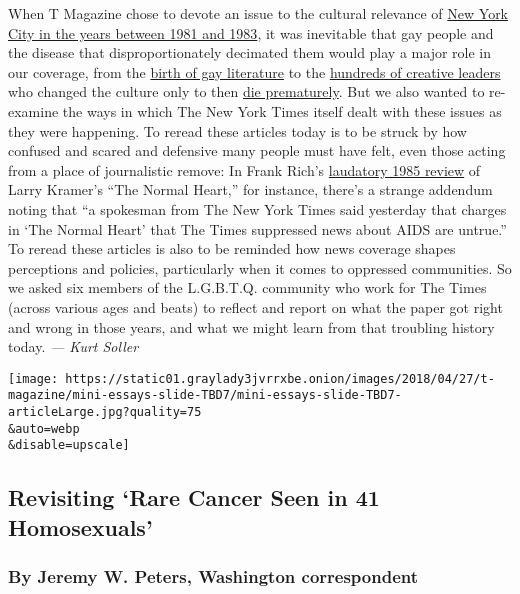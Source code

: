 When T Magazine chose to devote an issue to the cultural relevance of
\href{https://www.nytimes3xbfgragh.onion/interactive/2018/04/17/t-magazine/new-york-1980s-culture.html}{New
York City in the years between 1981 and 1983}, it was inevitable that
gay people and the disease that disproportionately decimated them would
play a major role in our coverage, from the
\href{https://www.nytimes3xbfgragh.onion/2018/04/16/t-magazine/gay-literature-1980s.html}{birth
of gay literature} to the
\href{https://www.nytimes3xbfgragh.onion/2018/04/19/t-magazine/keith-haring-tina-chow-aids-resurrected.html}{hundreds
of creative leaders} who changed the culture only to then
\href{https://www.nytimes3xbfgragh.onion/interactive/2018/04/17/t-magazine/aids-epidemic-deaths-new-york.html}{die
prematurely}. But we also wanted to re-examine the ways in which The New
York Times itself dealt with these issues as they were happening. To
reread these articles today is to be struck by how confused and scared
and defensive many people must have felt, even those acting from a place
of journalistic remove: In Frank Rich's
\href{https://www.nytimes3xbfgragh.onion/1985/04/22/theater/theater-the-normal-heart-by-larry-kramer.html}{laudatory
1985 review} of Larry Kramer's ``The Normal Heart,'' for instance,
there's a strange addendum noting that ``a spokesman from The New York
Times said yesterday that charges in `The Normal Heart' that The Times
suppressed news about AIDS are untrue.'' To reread these articles is
also to be reminded how news coverage shapes perceptions and policies,
particularly when it comes to oppressed communities. So we asked six
members of the L.G.B.T.Q. community who work for The Times (across
various ages and beats) to reflect and report on what the paper got
right and wrong in those years, and what we might learn from that
troubling history today. \emph{--- Kurt Soller}

\texttt{[image: https://static01.graylady3jvrrxbe.onion/images/2018/04/27/t-magazine/mini-essays-slide-TBD7/mini-essays-slide-TBD7-articleLarge.jpg?quality=75\\\&auto=webp\\\&disable=upscale]}

\hypertarget{revisiting-rare-cancer-seen-in-41-homosexuals}{%
\subsection{Revisiting `Rare Cancer Seen in 41
Homosexuals'}\label{revisiting-rare-cancer-seen-in-41-homosexuals}}

\hypertarget{by-jeremy-w-peters-washington-correspondent}{%
\subsubsection{By Jeremy W. Peters, Washington
correspondent}\label{by-jeremy-w-peters-washington-correspondent}}


